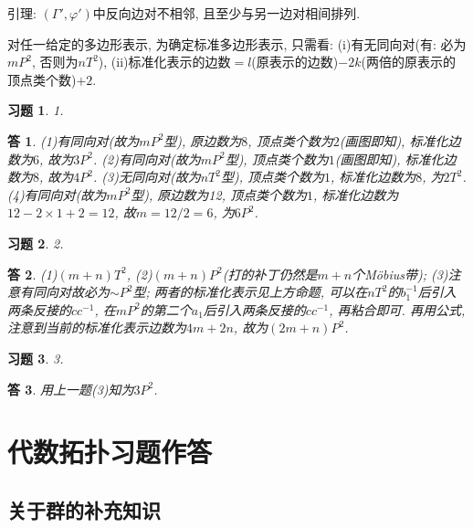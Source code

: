 \documentclass{ctexart}%
\newtheorem*{exercise}{习题}
\newtheorem*{solution}{答}
\theoremstyle{definition}
\theoremstyle{remark}
\begin{document}
引理: $(\Gamma', \varphi')$中反向边对不相邻, 且至少与另一边对相间排列.

对任一给定的多边形表示, 为确定标准多边形表示, 只需看: (i)有无同向对(有: 必为$mP^2$, 否则为$nT^2$), (ii)标准化表示的边数$=l$(原表示的边数)$-2k$(两倍的原表示的顶点类个数)$+2$. 

\begin{exercise}1. 
\end{exercise}
\begin{solution}(1)有同向对(故为$mP^2$型), 原边数为$8$, 顶点类个数为$2$(画图即知), 标准化边数为$6$, 故为$3P^2$. (2)有同向对(故为$mP^2$型), 顶点类个数为$1$(画图即知), 标准化边数为$8$, 故为$4P^2$. (3)无同向对(故为$nT^2$型), 顶点类个数为$1$, 标准化边数为$8$, 为$2T^2$. (4)有同向对(故为$mP^2$型), 原边数为12, 顶点类个数为$1$, 标准化边数为$12-2\times 1+2=12$, 故$m=12/2=6$, 为$6P^2$.
\end{solution}

\begin{exercise}2.
\end{exercise}
\begin{solution}(1)$(m+n)T^2$, (2)$(m+n)P^2$(打的补丁仍然是$m+n$个M\"{o}bius带); (3)注意有同向对故必为$\sim P^2$型; 两者的标准化表示见上方命题, 可以在$nT^2$的$b^{-1}_1$后引入两条反接的$cc^{-1}$, 在$mP^2$的第二个$a_1$后引入两条反接的$cc^{-1}$, 再粘合即可. 再用公式, 注意到当前的标准化表示边数为$4m+2n$, 故为$(2m+n)P^2$. 
\end{solution}

\begin{exercise}3. 
\end{exercise}
\begin{solution}
用上一题(3)知为$3P^2$.
\end{solution}

\section{代数拓扑习题作答}

\subsection{关于群的补充知识}
\end{document}

